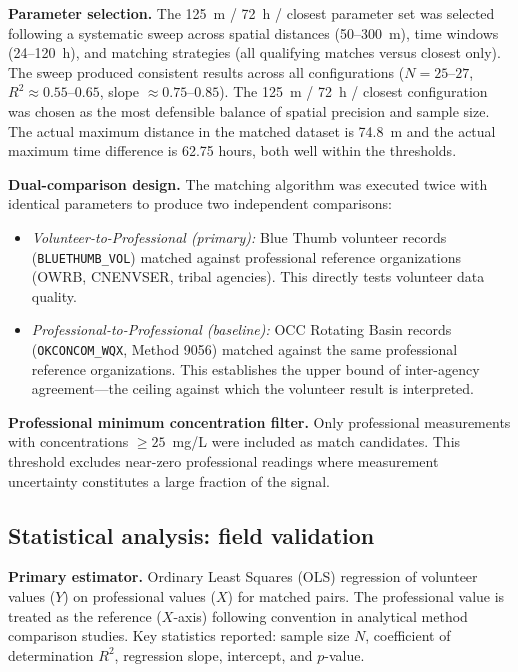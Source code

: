 \documentclass[lineno]{wlpeerj}
\begin{document}
\textbf{Parameter selection.} The 125~m / 72~h / closest parameter set was selected following a systematic sweep across spatial distances (50--300~m), time windows (24--120~h), and matching strategies (all qualifying matches versus closest only). The sweep produced consistent results across all configurations ($N = 25$--$27$, $R^{2} \approx 0.55$--$0.65$, slope $\approx 0.75$--$0.85$). The 125~m / 72~h / closest configuration was chosen as the most defensible balance of spatial precision and sample size. The actual maximum distance in the matched dataset is 74.8~m and the actual maximum time difference is 62.75 hours, both well within the thresholds.

\textbf{Dual-comparison design.} The matching algorithm was executed twice with identical parameters to produce two independent comparisons:

\begin{itemize}
  \item \emph{Volunteer-to-Professional (primary):} Blue Thumb volunteer records (\texttt{BLUETHUMB\_VOL}) matched against professional reference organizations (OWRB, CNENVSER, tribal agencies). This directly tests volunteer data quality.
  \item \emph{Professional-to-Professional (baseline):} OCC Rotating Basin records (\texttt{OKCONCOM\_WQX}, Method 9056) matched against the same professional reference organizations. This establishes the upper bound of inter-agency agreement---the ceiling against which the volunteer result is interpreted.
\end{itemize}

\textbf{Professional minimum concentration filter.} Only professional measurements with concentrations $\geq 25$~mg/L were included as match candidates. This threshold excludes near-zero professional readings where measurement uncertainty constitutes a large fraction of the signal.

\subsection{Statistical analysis: field validation}

\textbf{Primary estimator.} Ordinary Least Squares (OLS) regression of volunteer values ($Y$) on professional values ($X$) for matched pairs. The professional value is treated as the reference ($X$-axis) following convention in analytical method comparison studies. Key statistics reported: sample size $N$, coefficient of determination $R^{2}$, regression slope, intercept, and $p$-value.
\end{document}
